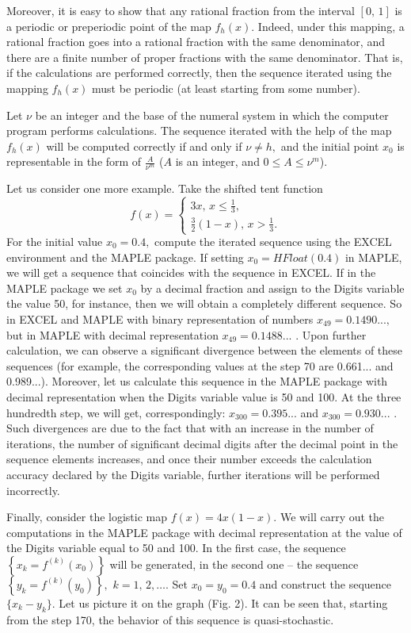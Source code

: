 \documentclass[12pt,a4paper]{amsart}
\begin{document}
Moreover, it is easy to show that any rational fraction from the interval $[0,\,1]$ is a periodic or preperiodic point of the map $f_h(x).$
Indeed, under this mapping, a rational fraction goes into a rational fraction with the same denominator, and there are a finite number 
of proper fractions with the same denominator. That is, if the calculations are performed correctly, then the sequence iterated using 
the mapping $f_h(x)$ must be periodic (at least starting from some number). 

Let $\nu$ be an integer and the base of the numeral system in which the computer program performs calculations. The sequence 
iterated with the help of the map $f_h(x)$ will be computed correctly if and only if $\nu\neq h,$ and the initial point $x_0$ is representable 
in the form of $\frac{A}{\nu^m}$ ($A$ is an integer, and $0\leq A\leq \nu^m$). 

Let us consider one more example. Take the shifted tent function  
$$f(x)=
\left\{\begin{array}{ll}
3x,\,x\leq\frac13, \\
\frac32(1-x),\,x>\frac13.
\end{array}\right.$$
For the initial value $x_0=0.4,$ compute the iterated sequence using the EXCEL environment and the MAPLE package. If setting 
$x_0=HFloat(0.4)$ in MAPLE, we will get a sequence that coincides with the sequence in EXCEL. If in the MAPLE package we set $x_0$ 
by a decimal fraction and assign to the Digits variable the value 50, for instance, then we will obtain a completely different sequence. 
So in EXCEL and MAPLE with binary representation of numbers $x_{49}=0.1490...,$ but in MAPLE with decimal representation
$x_{49}=0.1488...$ . Upon further calculation, we can observe a significant divergence between the elements of these sequences 
(for example, the corresponding values at the step 70 are 0.661... and 0.989...). Moreover, let us calculate this sequence in the MAPLE 
package with decimal representation when the Digits variable value is 50 and 100. At the three hundredth step, we will get, correspondingly: 
$x_{300}=0.395...$ and $x_{300}=0.930...$ . Such divergences are due to the fact that with an increase in the number of iterations, 
the number of significant decimal digits after the decimal point in the sequence elements increases, and once their number exceeds the 
calculation accuracy declared by the Digits variable, further iterations will be performed incorrectly.

Finally, consider the logistic map $f(x)=4x(1-x).$ We will carry out the computations in the MAPLE package with decimal representation 
at the value of the Digits variable equal to 50 and 100. In the first case, the sequence $\left\{x_k=f^{(k)}(x_0)\right\}$ will be generated, 
in the second one -- the sequence $\left\{y_k=f^{(k)}(y_0)\right\},$ $k=1,\,2,\ldots.$ Set $x_0=y_0=0.4$ and construct the sequence 
$\{x_k-y_k\}.$ Let us picture it on the graph (Fig. 2). It can be seen that, starting from the step 170, the behavior of this sequence is 
quasi-stochastic. 
\end{document}

